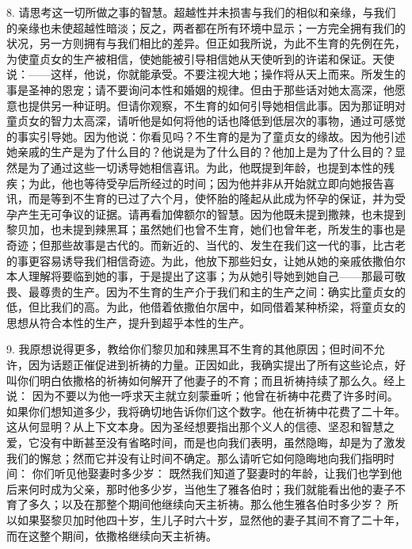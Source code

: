 8. 请思考这一切所做之事的智慧。超越性并未损害与我们的相似和亲缘，与我们的亲缘也未使超越性暗淡；反之，两者都在所有环境中显示；一方完全拥有我们的状况，另一方则拥有与我们相比的差异。但正如我所说，为此不生育的先例在先，为使童贞女的生产被相信，使她能被引导相信她从天使听到的许诺和保证。天使说：——这样，他说，你就能承受。不要注视大地；操作将从天上而来。所发生的事是圣神的恩宠；请不要询问本性和婚姻的规律。但由于那些话对她太高深，他愿意也提供另一种证明。但请你观察，不生育的如何引导她相信此事。因为那证明对童贞女的智力太高深，请听他是如何将他的话也降低到低层次的事物，通过可感觉的事实引导她。因为他说：你看见吗？不生育的是为了童贞女的缘故。因为他引述她亲戚的生产是为了什么目的？他说是为了什么目的？他加上是为了什么目的？显然是为了通过这些一切诱导她相信喜讯。为此，他既提到年龄，也提到本性的残疾；为此，他也等待受孕后所经过的时间；因为他并非从开始就立即向她报告喜讯，而是等到不生育的已过了六个月，使怀胎的隆起从此成为怀孕的保证，并为受孕产生无可争议的证据。请再看加俾额尔的智慧。因为他既未提到撒辣，也未提到黎贝加，也未提到辣黑耳；虽然她们也曾不生育，她们也曾年老，所发生的事也是奇迹；但那些故事是古代的。而新近的、当代的、发生在我们这一代的事，比古老的事更容易诱导我们相信奇迹。为此，他放下那些妇女，让她从她的亲戚依撒伯尔本人理解将要临到她的事，于是提出了这事；为从她引导她到她自己——那最可敬畏、最尊贵的生产。因为不生育的生产介于我们和主的生产之间：确实比童贞女的低，但比我们的高。为此，他借着依撒伯尔居中，如同借着某种桥梁，将童贞女的思想从符合本性的生产，提升到超乎本性的生产。\par

9. 我原想说得更多，教给你们黎贝加和辣黑耳不生育的其他原因；但时间不允许，因为话题正催促进到祈祷的力量。正因如此，我确实提出了所有这些论点，好叫你们明白依撒格的祈祷如何解开了他妻子的不育；而且祈祷持续了那么久。经上说： 因为不要以为他一呼求天主就立刻蒙垂听；他曾在祈祷中花费了许多时间。如果你们想知道多少，我将确切地告诉你们这个数字。他在祈祷中花费了二十年。这从何显明？从上下文本身。因为圣经想要指出那个义人的信德、坚忍和智慧之爱，它没有中断甚至没有省略时间，而是也向我们表明，虽然隐晦，却是为了激发我们的懈怠；然而它并没有让时间不确定。那么请听它如何隐晦地向我们指明时间： 你们听见他娶妻时多少岁： 既然我们知道了娶妻时的年龄，让我们也学到他后来何时成为父亲，那时他多少岁，当他生了雅各伯时；我们就能看出他的妻子不育了多久；以及在那整个期间他继续向天主祈祷。那么他生雅各伯时多少岁？ 所以如果娶黎贝加时他四十岁，生儿子时六十岁，显然他的妻子其间不育了二十年，而在这整个期间，依撒格继续向天主祈祷。\par

